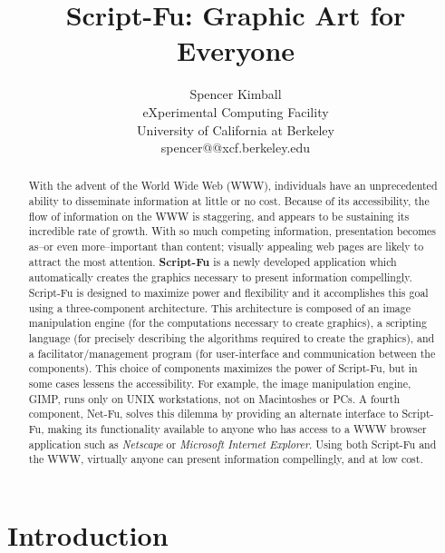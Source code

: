 \documentclass{article}
\begin{document}
\twocolumn

\begin{titlepage}
\title{{\bf Script-Fu: Graphic Art for Everyone}}
\author{Spencer Kimball\\
eXperimental Computing Facility\\
University of California at Berkeley\\
spencer@@xcf.berkeley.edu}
\maketitle

\thispagestyle{empty}
\begin{abstract}
With the advent of the World Wide Web (WWW), individuals
have an unprecedented ability to disseminate information at little or
no cost.  Because of its accessibility, the flow of information on the
WWW is staggering, and appears to be sustaining its incredible rate of
growth.  With so much competing information, presentation becomes
as--or even more--important than content; visually appealing web pages
are likely to attract the most attention.  {\bf Script-Fu} is a newly
developed application which automatically creates the graphics
necessary to present information compellingly.  Script-Fu is designed
to maximize power and flexibility and it accomplishes this goal using
a three-component architecture.  This architecture is composed of an
image manipulation engine (for the computations necessary to create
graphics), a scripting language (for precisely describing the
algorithms required to create the graphics), and a
facilitator/management program (for user-interface and communication
between the components).  This choice of components maximizes the
power of Script-Fu, but in some cases lessens the accessibility.  For
example, the image manipulation engine, GIMP, runs only on UNIX
workstations, not on Macintoshes or PCs.  A fourth component, Net-Fu,
solves this dilemma by providing an alternate interface to Script-Fu,
making its functionality available to anyone who has access to a WWW
browser application such as {\it Netscape} or {\it Microsoft Internet
Explorer}.  Using both Script-Fu and the WWW, virtually anyone can
present information compellingly, and at low cost.
\end{abstract}

\end{titlepage}

\section{Introduction}
\end{document}
